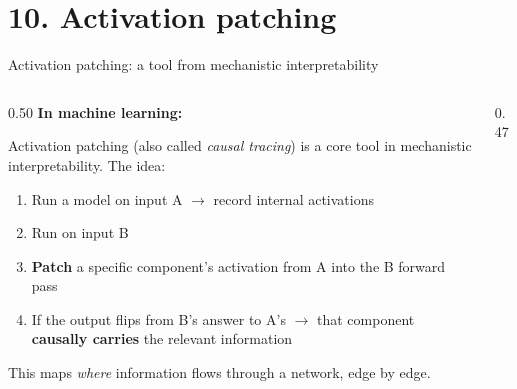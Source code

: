 \documentclass[aspectratio=169,11pt]{beamer}
\begin{document}
\section{10. Activation patching}

\begin{frame}{Activation patching: a tool from mechanistic interpretability}

\begin{columns}[T]
\begin{column}{0.50\textwidth}
\textbf{In machine learning:}

\vspace{0.3em}
{\small Activation patching (also called \emph{causal tracing}) is a core tool in mechanistic interpretability. The idea:}

\vspace{0.3em}
{\small
\begin{enumerate}\setlength\itemsep{0.3em}
  \item Run a model on input A $\to$ record internal activations
  \item Run on input B
  \item \textbf{Patch} a specific component's activation from A into the B forward pass
  \item If the output flips from B's answer to A's $\to$ that component \textbf{causally carries} the relevant information
\end{enumerate}
}

\vspace{0.5em}
{\small This maps \emph{where} information flows through a network, edge by edge.}
\end{column}

\begin{column}{0.47\textwidth}
\centering
\vspace{0.5em}
\end{column}
\end{columns}
\end{frame}
\end{document}
